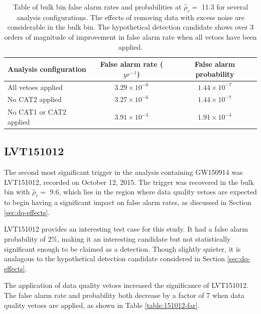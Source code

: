 \begin{table}[!ht]%
  \begin{center}
    \begin{tabular}{lcc}
      \hline
      Analysis configuration & False alarm rate ($yr^{-1}$) & False alarm probability \\ \hline
      All vetoes applied & $3.29\times10^{-6}$ & $1.44\times10^{-7}$\\
      No CAT2 applied & $3.27\times10^{-6}$ & $1.44\times10^{-7}$ \\
      No CAT1 or CAT2 applied & $3.91\times10^{-3}$ & $1.91\times10^{-4}$ \\
      \hline
    \end{tabular}
  \end{center}
  \caption[Bulk bin FAR - GW150914 analysis]{Table of bulk bin false alarm rates and probabilities at $\hat{\rho}_{c} =$ 11.3 %
           for several analysis configurations. %
           The effects of removing data with excess noise are considerable in the %
           bulk bin. The hypothetical detection candidate %
           shows over 3 orders of magnitude of improvement in false alarm rate
           when all vetoes have been applied.
           }
  \label{table:bulk-far}
\end{table}

\subsection{LVT151012}\label{sec:LVT151012}
The second most significant trigger in the analysis containing GW150914 was LVT151012,
recorded on October 12, 2015.
The trigger was recovered in the bulk bin with $\hat{\rho}_{c} =$ 9.6, which lies in the region
where data quality vetoes are expected to begin having a significant impact on false alarm rates,
as discussed in Section \ref{sec:dq-effects}.

LVT151012 provides an interesting test case for this study. It had a
false alarm probability of 2\%, making it an interesting candidate but not
statistically significant enough to be claimed as a detection. Though slightly quieter, it is
analagous
to the hypothetical detection candidate considered in Section \ref{sec:dq-effects}.

The application of data quality vetoes increased the significance of LVT151012.
The false alarm rate and probability both decrease by a factor of 7 when data quality vetoes are
applied, as shown in Table \ref{table:151012-far}.

